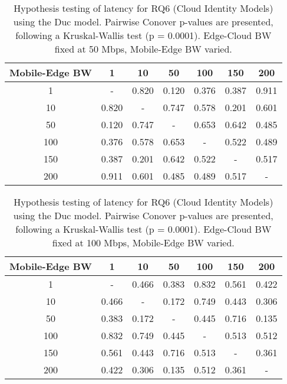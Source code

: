\begin{table}[H]
\caption{Hypothesis testing of latency for RQ6 (Cloud Identity Models) using the Duc model. Pairwise Conover p-values are presented, following a Kruskal-Wallis test (p = 0.0001). Edge-Cloud BW fixed at 50 Mbps, Mobile-Edge BW varied.}
\centering
\begin{tabular}{c|cccccc}
Mobile-Edge BW & 1 & 10 & 50 & 100 & 150 & 200 \\
\hline
1 & - & 0.820 & 0.120 & 0.376 & 0.387 & 0.911 \\
10 & 0.820 & - & 0.747 & 0.578 & 0.201 & 0.601 \\
50 & 0.120 & 0.747 & - & 0.653 & 0.642 & 0.485 \\
100 & 0.376 & 0.578 & 0.653 & - & 0.522 & 0.489 \\
150 & 0.387 & 0.201 & 0.642 & 0.522 & - & 0.517 \\
200 & 0.911 & 0.601 & 0.485 & 0.489 & 0.517 & - \\
\end{tabular}
\end{table}

\begin{table}[H]
\caption{Hypothesis testing of latency for RQ6 (Cloud Identity Models) using the Duc model. Pairwise Conover p-values are presented, following a Kruskal-Wallis test (p = 0.0001). Edge-Cloud BW fixed at 100 Mbps, Mobile-Edge BW varied.}
\centering
\begin{tabular}{c|cccccc}
Mobile-Edge BW & 1 & 10 & 50 & 100 & 150 & 200 \\
\hline
1 & - & 0.466 & 0.383 & 0.832 & 0.561 & 0.422 \\
10 & 0.466 & - & 0.172 & 0.749 & 0.443 & 0.306 \\
50 & 0.383 & 0.172 & - & 0.445 & 0.716 & 0.135 \\
100 & 0.832 & 0.749 & 0.445 & - & 0.513 & 0.512 \\
150 & 0.561 & 0.443 & 0.716 & 0.513 & - & 0.361 \\
200 & 0.422 & 0.306 & 0.135 & 0.512 & 0.361 & - \\
\end{tabular}
\end{table}


